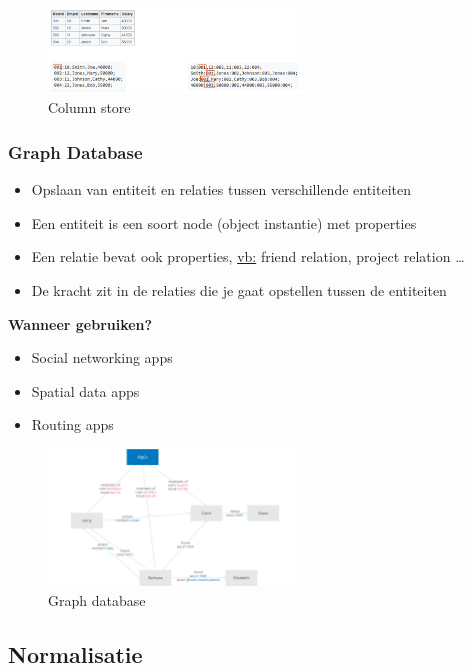 \documentclass{article}
\newcommand{\bold}[1]{\textbf{#1}}
\begin{document}
\begin{figure}[H]
    \centering
    \includegraphics[width=0.6\textwidth]{column-store.png}
    \caption{Column store}
\end{figure}

\subsubsection{Graph Database}

\begin{itemize}
    \item Opslaan van entiteit en relaties tussen verschillende entiteiten
    \item Een entiteit is een soort node (object instantie) met properties
    \item Een relatie bevat ook properties, \underline{vb:} friend relation, project relation \dots
    \item De kracht zit in de relaties die je gaat opstellen tussen de entiteiten
\end{itemize}

\bold{Wanneer gebruiken?}

\begin{itemize}
    \item Social networking apps
    \item Spatial data apps
    \item Routing apps
\end{itemize}

\begin{figure}[H]
    \centering
    \includegraphics[width=0.6\textwidth]{graph-database.png}
    \caption{Graph database}
\end{figure}

\subsection{Normalisatie}
\end{document}
